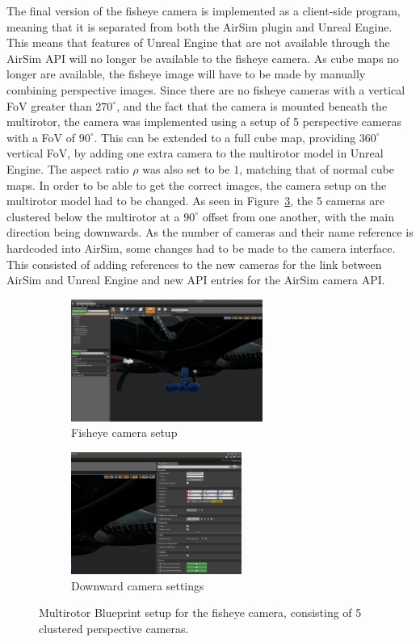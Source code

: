 The final version of the fisheye camera is implemented as a client-side program, meaning that it is separated from both the AirSim plugin and Unreal Engine. This means that features of Unreal Engine that are not available through the AirSim API will no longer be available to the fisheye camera. As cube maps no longer are available, the fisheye image will have to be made by manually combining perspective images. Since there are no fisheye cameras with a vertical FoV greater than $270^\circ$, and the fact that the camera is mounted beneath the multirotor, the camera was implemented using a setup of 5 perspective cameras with a FoV of $90^\circ$. This can be extended to a full cube map, providing $360^\circ$ vertical FoV, by adding one extra camera to the multirotor model in Unreal Engine. The aspect ratio $\rho$ was also set to be $1$, matching that of normal cube maps. 
In order to be able to get the correct images, the camera setup on the multirotor model had to be changed. As seen in Figure~\ref{fig:new_Blueprint_multirotor}, the 5 cameras are clustered below the multirotor at a $90^\circ$ offset from one another, with the main direction being downwards. As the number of cameras and their name reference is hardcoded into AirSim, some changes had to be made to the camera interface. This consisted of adding references to the new cameras for the link between AirSim and Unreal Engine and new API entries for the AirSim camera API.

\begin{figure}[!htb]
    \centering
    \begin{subfigure}{0.45\linewidth}
        \centering
        \includegraphics[height=4cm]{rapport/fig/Simulator/camera_setup.png}
        \caption{Fisheye camera setup}
        \label{fig:new_Blueprint_cameras}
    \end{subfigure}
    \begin{subfigure}{0.45\linewidth}
        \centering
        \includegraphics[height=4cm]{rapport/fig/Simulator/camera_setting.png}
        \caption{Downward camera settings}
        \label{fig:new_Blueprint_nodes}
    \end{subfigure}
    \caption{Multirotor Blueprint setup for the fisheye camera, consisting of 5 clustered perspective cameras.}
    \label{fig:new_Blueprint_multirotor}
\end{figure}

